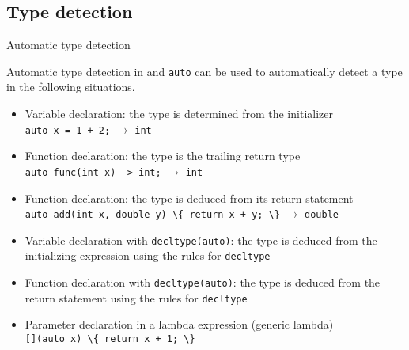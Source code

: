 

\subsection{Type detection}

\begin{frame}{Automatic type detection}{}
  \begin{block}{Automatic type detection in  and }
    \lstinline!auto! can be used to automatically detect a type in the following situations.
    \begin{itemize}
    \item
      Variable declaration: the type is determined from the initializer \\
      \lstinline!auto x = 1 + 2;! $\to$ \lstinline!int!
    \item
      Function declaration: the type is the trailing return type \\
      \lstinline!auto func(int x) -> int;! $\to$ \lstinline!int!
    \item
      Function declaration: the type is deduced from its return statement \\
      \lstinline!auto add(int x, double y) \{ return x + y; \}! $\to$ \lstinline!double!
    \item
      Variable declaration with \lstinline!decltype(auto)!: the type is deduced from the initializing expression using the rules for \lstinline!decltype!
    \item
      Function declaration with \lstinline!decltype(auto)!: the type is deduced from the return statement using the rules for \lstinline!decltype!
    \item
      Parameter declaration in a lambda expression (generic lambda) \\
      \lstinline![](auto x) \{ return x + 1; \}!
    \end{itemize}
  \end{block}
\end{frame}

